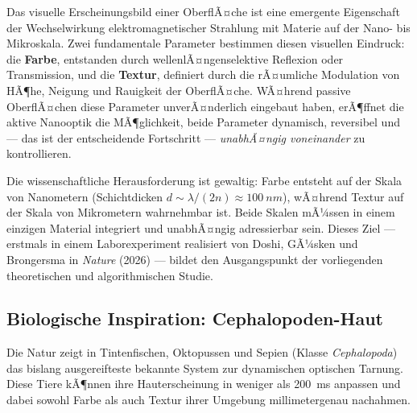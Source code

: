 ﻿\documentclass[a4paper,12pt]{article}
\theoremstyle{definition}
\begin{document}
	Das visuelle Erscheinungsbild einer OberflÃ¤che ist eine emergente Eigenschaft
	der Wechselwirkung elektromagnetischer Strahlung mit Materie auf der Nano- bis
	Mikroskala. Zwei fundamentale Parameter bestimmen diesen visuellen Eindruck:
	die \textbf{Farbe}, entstanden durch wellenlÃ¤ngenselektive Reflexion oder
	Transmission, und die \textbf{Textur}, definiert durch die rÃ¤umliche Modulation
	von HÃ¶he, Neigung und Rauigkeit der OberflÃ¤che. WÃ¤hrend passive OberflÃ¤chen
	diese Parameter unverÃ¤nderlich eingebaut haben, erÃ¶ffnet die aktive Nanooptik
	die MÃ¶glichkeit, beide Parameter dynamisch, reversibel und --- das ist der
	entscheidende Fortschritt --- \emph{unabhÃ¤ngig voneinander} zu kontrollieren.
	
	Die wissenschaftliche Herausforderung ist gewaltig: Farbe entsteht auf der
	Skala von Nanometern (Schichtdicken $d \sim \lambda/(2n) \approx \SI{100}{nm}$),
	wÃ¤hrend Textur auf der Skala von Mikrometern wahrnehmbar ist. Beide Skalen
	mÃ¼ssen in einem einzigen Material integriert und unabhÃ¤ngig adressierbar sein.
	Dieses Ziel --- erstmals in einem Laborexperiment realisiert von Doshi,
	GÃ¼sken und Brongersma in \emph{Nature} (2026) --- bildet den Ausgangspunkt
	der vorliegenden theoretischen und algorithmischen Studie.
	
	\subsection{Biologische Inspiration: Cephalopoden-Haut}
	\label{ssec:bio}
	
	Die Natur zeigt in Tintenfischen, Oktopussen und Sepien (Klasse
	\textit{Cephalopoda}) das bislang ausgereifteste bekannte System zur dynamischen
	optischen Tarnung. Diese Tiere kÃ¶nnen ihre Hauterscheinung in weniger als
	\SI{200}{ms} anpassen und dabei sowohl Farbe als auch Textur ihrer Umgebung
	millimetergenau nachahmen.
	
\end{document}

